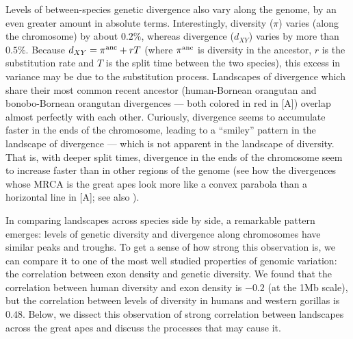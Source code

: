 Levels of between-species genetic divergence also vary along the genome, by an even greater amount in absolute terms.
Interestingly, diversity ($\pi$) varies (along the chromosome) by about $0.2\%$, whereas divergence ($d_{XY}$) varies by more than $0.5\%$.
Because $d_{XY} = \pi^{\mathrm{anc}} + rT$ (where $\pi^{\mathrm{anc}}$ is diversity in the ancestor, $r$ is the substitution rate and $T$ is the split time between the two species),
this excess in variance may be due to the substitution process.
Landscapes of divergence which share their most common recent ancestor (\eg human-Bornean orangutan and bonobo-Bornean orangutan divergences --- both colored in red in [A]) overlap almost perfectly with each other.
Curiously, divergence seems to accumulate faster in the ends of the chromosome, leading to a ``smiley'' pattern in the landscape of divergence
--- which is not apparent in the landscape of diversity.
That is, with deeper split times, divergence in the ends of the chromosome seem to increase faster than in other regions of the genome (see how the divergences whose MRCA is the great apes look more like a convex parabola than a horizontal line in [A]; see also ).

In comparing landscapes across species side by side, 
a remarkable pattern emerges: levels of genetic diversity and divergence along chromosomes have similar peaks and troughs.
To get a sense of how strong this observation is, we can compare it to one of the most well studied properties of genomic variation:
the correlation between exon density and genetic diversity.
We found that the correlation between human diversity and exon density is $-0.2$ (at the 1Mb scale),
but the correlation between levels of diversity in humans and western gorillas is $0.48$.
Below, we dissect this observation of strong correlation between landscapes across the great apes and discuss the processes that may cause it.


